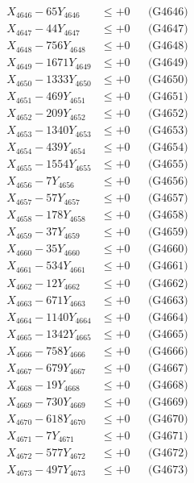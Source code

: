 \documentclass[a4paper,10pt]{article}
\begin{document}
{\begin{align}
X_{4646} - 65Y_{4646} &\leq +0 && \text{(G4646)} \\
X_{4647} - 44Y_{4647} &\leq +0 && \text{(G4647)} \\
X_{4648} - 756Y_{4648} &\leq +0 && \text{(G4648)} \\
X_{4649} - 1671Y_{4649} &\leq +0 && \text{(G4649)} \\
X_{4650} - 1333Y_{4650} &\leq +0 && \text{(G4650)} \\
\allowbreak
X_{4651} - 469Y_{4651} &\leq +0 && \text{(G4651)} \\
X_{4652} - 209Y_{4652} &\leq +0 && \text{(G4652)} \\
X_{4653} - 1340Y_{4653} &\leq +0 && \text{(G4653)} \\
X_{4654} - 439Y_{4654} &\leq +0 && \text{(G4654)} \\
X_{4655} - 1554Y_{4655} &\leq +0 && \text{(G4655)} \\
X_{4656} - 7Y_{4656} &\leq +0 && \text{(G4656)} \\
X_{4657} - 57Y_{4657} &\leq +0 && \text{(G4657)} \\
X_{4658} - 178Y_{4658} &\leq +0 && \text{(G4658)} \\
X_{4659} - 37Y_{4659} &\leq +0 && \text{(G4659)} \\
X_{4660} - 35Y_{4660} &\leq +0 && \text{(G4660)} \\
\allowbreak
X_{4661} - 534Y_{4661} &\leq +0 && \text{(G4661)} \\
X_{4662} - 12Y_{4662} &\leq +0 && \text{(G4662)} \\
X_{4663} - 671Y_{4663} &\leq +0 && \text{(G4663)} \\
X_{4664} - 1140Y_{4664} &\leq +0 && \text{(G4664)} \\
X_{4665} - 1342Y_{4665} &\leq +0 && \text{(G4665)} \\
X_{4666} - 758Y_{4666} &\leq +0 && \text{(G4666)} \\
X_{4667} - 679Y_{4667} &\leq +0 && \text{(G4667)} \\
X_{4668} - 19Y_{4668} &\leq +0 && \text{(G4668)} \\
X_{4669} - 730Y_{4669} &\leq +0 && \text{(G4669)} \\
X_{4670} - 618Y_{4670} &\leq +0 && \text{(G4670)} \\
\allowbreak
X_{4671} - 7Y_{4671} &\leq +0 && \text{(G4671)} \\
X_{4672} - 577Y_{4672} &\leq +0 && \text{(G4672)} \\
X_{4673} - 497Y_{4673} &\leq +0 && \text{(G4673)} \\

\end{align}}
\end{document}
